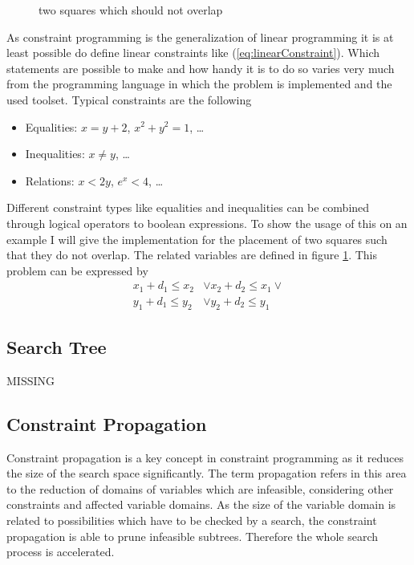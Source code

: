\documentclass[10pt,
               a4paper,
               journal,
               ]{IEEEtran}
\newcommand{\reffig}[1]{{figure \ref{#1}}}
\newcommand{\refeq}[1]{{(\ref{#1})}}
\begin{document}
	\begin{figure}
	\center
	\caption{two squares which should not overlap}
	\label{fig:squares}
	\end{figure}
	
	As constraint programming is the generalization of linear programming it is at least possible do define linear constraints like \refeq{eq:linearConstraint}. Which statements are possible to make and how handy it is to do so varies very much from the programming language in which the problem is implemented and the used toolset. Typical constraints are the following
	\begin{itemize}
		\item Equalities: $x = y + 2$, $x^2 + y^2 = 1$, \dots
		\item Inequalities: $x \ne y$, \dots
		\item Relations: $x < 2 y$, $e^x < 4$, \dots
	\end{itemize}
	
	Different constraint types like equalities and inequalities can be combined through logical operators to boolean expressions. To show the usage of this on an example I will give the implementation for the placement of two squares such that they do not overlap. The related variables are defined in \reffig{fig:squares}. This problem can be expressed by \cite[p. 101]{programmingGecode}
	\begin{equation}
	\begin{split}
		x_1 + d_1 \le x_2 & \lor x_2 + d_2 \le x_1 \lor \\
		y_1 + d_1 \le y_2 & \lor y_2 + d_2 \le y_1
	\end{split}
	\end{equation}
	
	\subsection{Search Tree}
	MISSING
	
	\subsection{Constraint Propagation}
	Constraint propagation is a key concept in constraint programming as it reduces the size of the search space significantly. The term propagation refers in this area to the reduction of domains of variables which are infeasible, considering other constraints and affected variable domains. As the size of the variable domain is related to possibilities which have to be checked by a search, the constraint propagation is able to prune infeasible subtrees. Therefore the whole search process is accelerated.
	
\end{document}
